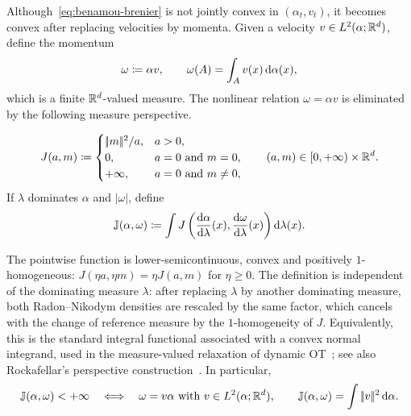 Although~\eqref{eq:benamou-brenier} is not jointly convex in $(\alpha_t,v_t)$, it becomes convex after replacing velocities by momenta. Given a velocity \(v\in L^2(\alpha;\mathbb{R}^d)\), define the momentum
\[
	\omega\coloneqq \alpha v,
	\qquad
	\omega(A)=\int_A v(x)\,\mathrm{d}\alpha(x),
\]
which is a finite \(\mathbb{R}^d\)-valued measure. The nonlinear relation \(\omega=\alpha v\) is eliminated by the following measure perspective.
\begin{defn}\label{def-quadratic-perspective-action}
\begin{equation}\label{eq-quadratic-perspective}
	J(a,m)
	\coloneqq
	\begin{cases}
		|\!| m |\!|^2/a, & a>0,\\
		0, & a=0\ \text{and}\ m=0,\\
	+\infty, & a=0\ \text{and}\ m\neq0,
	\end{cases}
	\qquad
	(a,m)\in[0,+\infty)\times\mathbb{R}^d.
\end{equation}
If \(\lambda\) dominates \(\alpha\) and \(|\omega|\), define
\begin{equation}\label{eq-measure-perspective-action}
	\mathbb J(\alpha,\omega)
	\coloneqq
	\int
	J\left(
		\frac{\mathrm{d}\alpha}{\mathrm{d}\lambda}(x),
		\frac{\mathrm{d} \omega}{\mathrm{d}\lambda}(x)
	\right)\mathrm{d}\lambda(x).
\end{equation}
\end{defn}
The pointwise function is lower-semicontinuous, convex and positively \(1\)-homogeneous: \(J(\eta a,\eta m)=\eta J(a,m)\) for \(\eta\geq0\).
The definition is independent of the dominating measure \(\lambda\): after replacing \(\lambda\) by another dominating measure, both Radon--Nikodym densities are rescaled by the same factor, which cancels with the change of reference measure by the \(1\)-homogeneity of \(J\). Equivalently, this is the standard integral functional associated with a convex normal integrand, used in the measure-valued relaxation of dynamic OT~\cite{ambrosio2006gradient}; see also Rockafellar's perspective construction~\cite{rockafellar2015convex}. In particular,
\[
	\mathbb J(\alpha,\omega)<+\infty
	\quad\Longleftrightarrow\quad
	\omega=v\alpha\ \text{with}\ v\in L^2(\alpha;\mathbb{R}^d),
	\qquad
	\mathbb J(\alpha,\omega)=\int|\!| v |\!|^2\,\mathrm{d}\alpha.
\]

